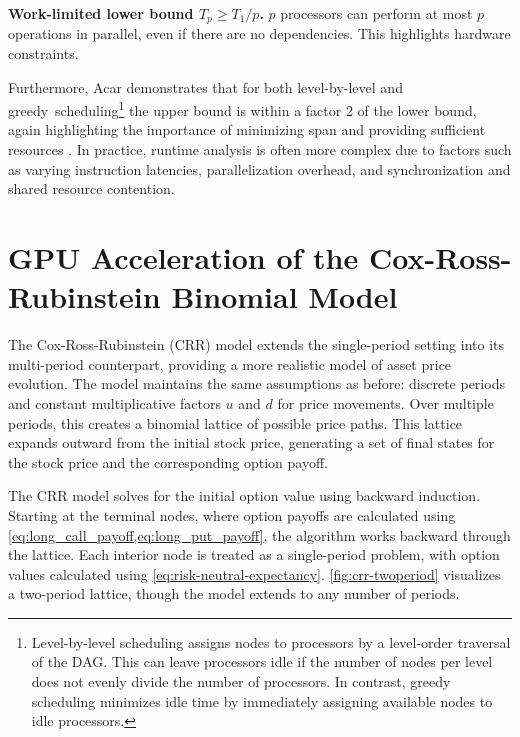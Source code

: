 \documentclass[english,12pt,a4paper,pdftex,sci,utf8]{aaltothesis}
\begin{document}
\vspace{0.5\baselineskip}
\noindent\textbf{Work-limited lower bound $T_p \geq T_1/p$.} $p$ processors can perform at most $p$ operations in parallel, even if there are no dependencies. This highlights hardware constraints.

\vspace{\baselineskip}
\noindent Furthermore, Acar demonstrates that for both level-by-level and \mbox{greedy scheduling}\footnote{Level-by-level scheduling assigns nodes to processors by a level-order traversal of the DAG. This can leave processors idle if the number of nodes per level does not evenly divide the number of processors. In contrast, greedy scheduling minimizes idle time by immediately assigning available nodes to idle processors.} the upper bound is within a factor 2 of the lower bound, again highlighting the importance of minimizing span and providing sufficient resources \cite{acar2016parallel}. In practice, runtime analysis is often more complex due to factors such as varying instruction latencies, parallelization overhead, and synchronization and shared resource contention.
\clearpage

\section{GPU Acceleration of the Cox-Ross-Rubinstein Binomial Model} \label{sec:gpu-crr}
The Cox-Ross-Rubinstein (CRR) model \cite{cox1979option} extends the single-period setting into its multi-period counterpart, providing a more realistic model of asset price evolution. The model maintains the same assumptions as before: discrete periods and constant multiplicative factors $u$ and $d$ for price movements. Over multiple periods, this creates a binomial lattice of possible price paths. This lattice expands outward from the initial stock price, generating a set of final states for the stock price and the corresponding option payoff.

The CRR model solves for the initial option value using backward induction. Starting at the terminal nodes, where option payoffs are calculated using \cref{eq:long_call_payoff,eq:long_put_payoff}, the algorithm works backward through the lattice. Each interior node is treated as a single-period problem, with option values calculated using \cref{eq:risk-neutral-expectancy}. \cref{fig:crr-twoperiod} visualizes a two-period lattice, though the model extends to any number of periods.
\end{document}
